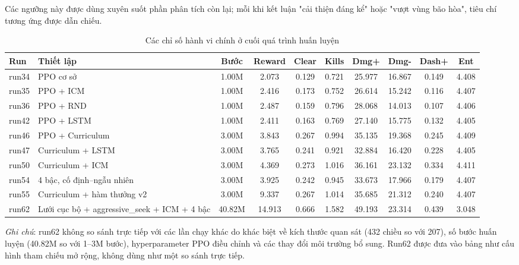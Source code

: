Các ngưỡng này được dùng xuyên suốt phần phân tích còn lại; mỗi khi kết luận "cải thiện đáng kể" hoặc "vượt vùng bão hòa", tiêu chí tương ứng được dẫn chiếu.

\begin{table}[H]
    \centering
    \scriptsize
    \setlength{\tabcolsep}{4pt}
    \renewcommand{\arraystretch}{1.15}
    \caption{Các chỉ số hành vi chính ở cuối quá trình huấn luyện}
    \label{tab:run_metrics_main}
    \begin{tabular}{l p{3.0cm} c c c c c c c c}
        \toprule
        \textbf{Run} & \textbf{Thiết lập} & \textbf{Bước} & \textbf{Reward} & \textbf{Clear} & \textbf{Kills} & \textbf{Dmg+} & \textbf{Dmg-} & \textbf{Dash+} & \textbf{Ent} \\
        \midrule
        run34 & PPO cơ sở & 1.00M & 2.073 & 0.129 & 0.721 & 25.977 & 16.867 & 0.149 & 4.408 \\
        run35 & PPO + ICM & 1.00M & 2.416 & 0.173 & 0.752 & 26.614 & 15.242 & 0.116 & 4.407 \\
        run36 & PPO + RND & 1.00M & 2.487 & 0.159 & 0.796 & 28.068 & 14.013 & 0.107 & 4.406 \\
        run42 & PPO + LSTM & 1.00M & 2.411 & 0.163 & 0.769 & 27.140 & 15.775 & 0.132 & 4.405 \\
        run46 & PPO + Curriculum & 3.00M & 3.843 & 0.267 & 0.994 & 35.135 & 19.368 & 0.245 & 4.409 \\
        run47 & Curriculum + LSTM & 3.00M & 3.765 & 0.241 & 0.921 & 32.884 & 16.420 & 0.228 & 4.405 \\
        run50 & Curriculum + ICM & 3.00M & 4.369 & 0.273 & 1.016 & 36.161 & 23.132 & 0.334 & 4.411 \\
        run54 & 4 bậc, cố định--ngẫu nhiên & 3.00M & 3.925 & 0.242 & 0.945 & 33.673 & 17.966 & 0.179 & 4.407 \\
        run55 & Curriculum + hàm thưởng v2 & 3.00M & 9.337 & 0.267 & 1.014 & 35.685 & 21.312 & 0.240 & 4.407 \\
        run62 & Lưới cục bộ + aggressive\_seek + ICM + 4 bậc & 40.82M & 14.913 & 0.666 & 1.582 & 49.193 & 23.314 & 0.439 & 3.048 \\
        \bottomrule
    \end{tabular}
    \vspace{10pt}
    
    \begin{minipage}{0.96\textwidth}
        \small\textit{Ghi chú}: run62 không so sánh trực tiếp với các lần chạy khác do khác biệt về kích thước quan sát (432 chiều so với 207), số bước huấn luyện (40.82M so với 1--3M bước), hyperparameter PPO điều chỉnh và các thay đổi môi trường bổ sung. Run62 được đưa vào bảng như cấu hình tham chiếu mở rộng, không dùng như một so sánh trực tiếp.
    \end{minipage}
\end{table}

